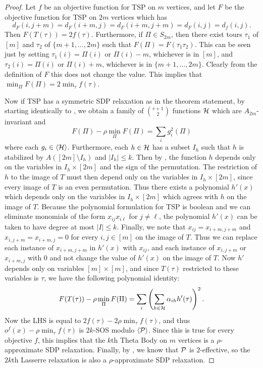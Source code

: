 \begin{proof}
Let $f$ be an objective function for \textsc{TSP} on $m$ vertices, and let $F$ be the objective function for \textsc{TSP} on $2m$ vertices which has 
\[d_F(i,j+m) = d_F(i+m, j) = d_F(i+m, j+m) = d_F(i,j) = d_f(i,j).\] 
Then $F(T(\tau)) = 2f(\tau)$. Furthermore, if $\Pi \in S_{2m}$, then there exist tours $\tau_1$ of $[m]$ and $\tau_2$ of $\{m+1,\dots,2m\}$ such that $F(\Pi) = F(\tau_1\tau_2)$. This can be seen just by setting $\tau_1(i) = \Pi(i)$ or $\Pi(i) - m$, whichever is in $[m]$, and $\tau_2(i) = \Pi(i)$ or $\Pi(i)+m$, whichever is in $\{m+1,\dots,2m\}$. Clearly from the definition of $F$ this does not change the value. This implies that $\min_\Pi F(\Pi) = 2\min_{\tau} f(\tau)$.

Now if \textsc{TSP} has a symmetric SDP relaxation as in the theorem statement, by starting identically to , we obtain a family of $\binom{r+1}{2}$ functions $\mathcal H$ which are $A_{2m}$-invariant and
\[F(\Pi) - \rho\min_{\Pi} F(\Pi) = \sum_i g_i^2(\Pi)\]
where each $g_i \in \langle \mathcal H \rangle$. Furthermore, each $h \in \mathcal H$ has a subset $I_h$ such that $h$ is stabilized by $A([2m] \setminus I_h)$ and $|I_h| \leq k$. Then by , the function $h$ depends only on the variables in $I_h \times [2m]$ and the sign of the permutation. The restriction of $h$ to the image of $T$ must then depend only on the variables in $I_h \times [2m]$, since every image of $T$ is an even permutation. Thus there exists a polynomial $h'(x)$ which depends only on the variables in $I_h \times [2m]$ which agrees with $h$ on the image of $T$. Because the polynomial formulation for \textsc{TSP} is boolean and we can eliminate monomials of the form $x_{ij}x_{i\ell}$ for $j \neq \ell$, the polynomial $h'(x)$ can be taken to have degree at most $|I| \leq k$. Finally, we note that $x_{ij} = x_{i+m,j+m}$ and $x_{i,j+m} = x_{i+m,j} = 0$ for every $i,j \in [m]$ on the image of $T$. Thus we can replace each instance of $x_{i+m,j+m}$ in $h'(x)$ with $x_{ij}$, and each instance of $x_{i,j+m}$ or $x_{i+m,j}$ with $0$ and not change the value of $h'(x)$ on the image of $T$. Now $h'$ depends only on variables $[m] \times [m]$, and since $T(\tau)$ restricted to these variables is $\tau$, we have the following polynomial identity:
\[F(T(\tau)) - \rho\min_{\Pi} F(\Pi) = \sum_i \left(\sum_{h \in \mathcal H} \alpha_{ih} h'(\tau)\right)^2.\]
Now the LHS is equal to $2f(\tau) - 2\rho \min_{\tau} f(\tau)$, and thus $o^f(x) - \rho \min_{\tau} f(\tau)$ is $2k$-SOS modulo $\langle \mathcal P \rangle$. Since this is true for every objective $f$, this implies that the $k$th Theta Body on $m$ vertices is a $\rho$-approximate SDP relaxation. Finally, by , we know that $\mathcal P$ is $2$-effective, so the $2k$th Lasserre relaxation is also a $\rho$-approximate SDP relaxation.
\end{proof}

